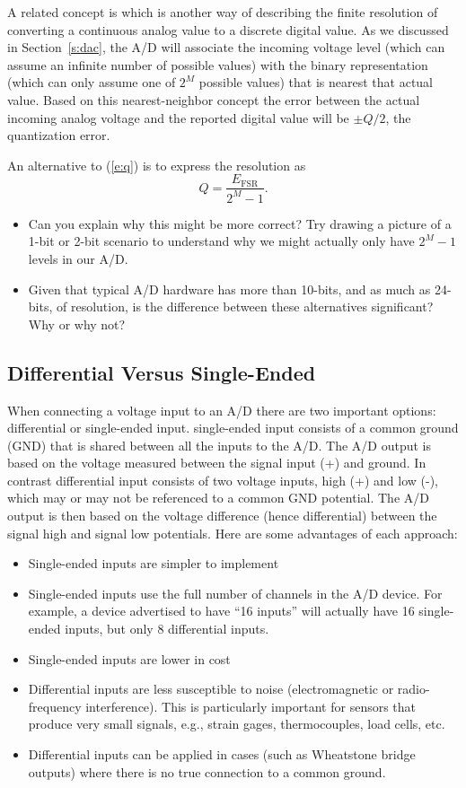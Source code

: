 A related concept is  which is another way of describing the finite resolution of converting a continuous analog value to a discrete digital value.  As we discussed in Section~\ref{s:dac}, the A/D will associate the incoming voltage level (which can assume an infinite number of possible values) with the binary representation (which can only assume one of $2^M$ possible values) that is nearest that actual value.  Based on this nearest-neighbor concept the error between the actual incoming analog voltage and the reported digital value will be $\pm Q/2$, the quantization error.


\begin{ex}
An alternative to (\ref{e:q}) is to express the resolution as 
\[
Q = \frac{E_{\mathrm{FSR}}}{2^M-1}.
\]
\begin{itemize}
\item Can you explain why this might be more correct?  Try drawing a picture of a 1-bit or 2-bit scenario to understand why we might actually only have $2^M-1$ levels in our A/D.
\item Given that typical A/D hardware has more than 10-bits, and as much as 24-bits, of resolution, is the difference between these alternatives significant?  Why or why not?
\end{itemize}
\end{ex}

\subsection{Differential Versus Single-Ended}
When connecting a voltage input to an A/D there are two important options: differential or single-ended input. \Gls{single-ended input} consists of a common ground (GND) that is shared between all the inputs to the A/D.  The A/D output is based on the voltage measured between the signal input (+) and ground.  In contrast \gls{differential input} consists of two voltage inputs, high (+) and low (-), which may or may not be referenced to a common GND potential.  The A/D output is then based on the voltage difference (hence differential) between the signal high and signal low potentials.  Here are some advantages of each approach:
\begin{itemize}
\item Single-ended inputs are simpler to implement
\item Single-ended inputs use the full number of channels in the A/D device. For example, a device advertised to have ``16 inputs'' will actually have 16 single-ended inputs, but only 8 differential inputs.
\item Single-ended inputs are lower in cost
\item Differential inputs are less susceptible to noise (electromagnetic or radio-frequency interference).  This is particularly important for sensors that produce very small signals, e.g., strain gages, thermocouples, load cells, etc.
\item Differential inputs can be applied in cases (such as Wheatstone bridge outputs) where there is no true connection to a common ground.
\end{itemize}


